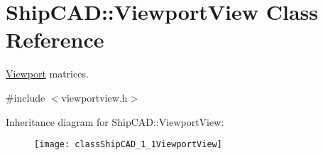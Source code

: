 \hypertarget{classShipCAD_1_1ViewportView}{}\section{Ship\+C\+AD\+:\+:Viewport\+View Class Reference}
\label{classShipCAD_1_1ViewportView}


\hyperlink{classShipCAD_1_1Viewport}{Viewport} matrices.  




{\ttfamily \#include $<$viewportview.\+h$>$}

Inheritance diagram for Ship\+C\+AD\+:\+:Viewport\+View\+:\begin{figure}[H]
\begin{center}
\leavevmode
\texttt{[image: classShipCAD\_1\_1ViewportView]}
\end{center}
\end{figure}
